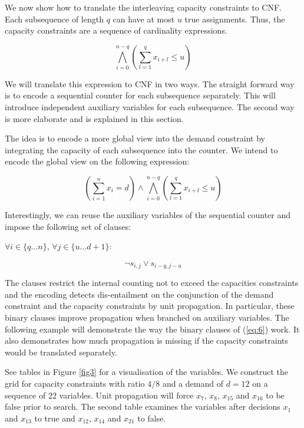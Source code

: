 \documentclass[]{llncs}
\begin{document}
We now show how to translate the interleaving capacity constraints to CNF. Each subsequence of length $q$ can have at
most $u$ true assignments. Thus, the capacity constraints are a sequence of cardinality expressions. 

$$\bigwedge_{i=0}^{n-q}(\sum_{l=1}^q x_{i+l} \leq u )$$

We will translate this expression to CNF in two ways. The straight forward way is to encode a sequential counter for
each subsequence separately. This will introduce independent auxiliary variables for each subsequence. The second way is
more elaborate and is explained in this section.

The idea is to encode a more global view into the demand constraint by integrating the capacity of each subsequence into
the counter. We intend to encode the global view on the following expression: 

$$ (\sum_{i=1}^n x_{i} = d) \wedge \bigwedge_{i=0}^{n-q}(\sum_{l=1}^q x_{i+l} \leq u )$$

Interestingly, we can reuse the auxiliary variables of the sequential counter and impose the following set of clauses: 

$\forall {i \in \{q \ldots n\}}$, $\forall {j\in\{u\ldots d+1\}}$: 

\begin{equation} \label{eq:6}
    \neg s_{i,j} \vee s_{i-q,j-u}
\end{equation}               

The clauses restrict the internal counting not to exceed the capacities constraints and the encoding detects
dis-entailment on the conjunction of the demand constraint and the capacity constraints by unit propagation. In
particular, these binary clauses improve propagation when branched on auxiliary variables. The following example will
demonstrate the way the binary clauses of (\ref{eq:6}) work. It also demonstrates how much propagation is missing if the
capacity constraints would be translated separately. 

\begin{example}
\label{ex:large} See tables in Figure \ref{fig3} for a visualisation of the variables. We construct the grid for 
capacity constraints with ratio $4/8$ and a demand of $d=12$ on a sequence of 22 variables. Unit propagation will force $x_{7}$,
$x_{8}$, $x_{15}$ and $x_{16}$ to be false prior to search. The second table examines the variables after decisions
$x_{1}$ and $x_{13}$ to true and $x_{12}$, $x_{14}$ and $x_{21}$ to false.
\end{example}
\end{document}
